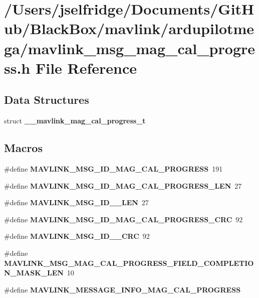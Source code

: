 \section{/\+Users/jselfridge/\+Documents/\+Git\+Hub/\+Black\+Box/mavlink/ardupilotmega/mavlink\+\_\+msg\+\_\+mag\+\_\+cal\+\_\+progress.h File Reference}
\label{mavlink__msg__mag__cal__progress_8h}
\subsection*{Data Structures}
\begin{DoxyCompactItemize}
\item 
struct \textbf{ \+\_\+\+\_\+mavlink\+\_\+mag\+\_\+cal\+\_\+progress\+\_\+t}
\end{DoxyCompactItemize}
\subsection*{Macros}
\begin{DoxyCompactItemize}
\item 
\#define \textbf{ M\+A\+V\+L\+I\+N\+K\+\_\+\+M\+S\+G\+\_\+\+I\+D\+\_\+\+M\+A\+G\+\_\+\+C\+A\+L\+\_\+\+P\+R\+O\+G\+R\+E\+SS}~191
\item 
\#define \textbf{ M\+A\+V\+L\+I\+N\+K\+\_\+\+M\+S\+G\+\_\+\+I\+D\+\_\+\+M\+A\+G\+\_\+\+C\+A\+L\+\_\+\+P\+R\+O\+G\+R\+E\+S\+S\+\_\+\+L\+EN}~27
\item 
\#define \textbf{ M\+A\+V\+L\+I\+N\+K\+\_\+\+M\+S\+G\+\_\+\+I\+D\+\_\+\_\+\+L\+EN}~27
\item 
\#define \textbf{ M\+A\+V\+L\+I\+N\+K\+\_\+\+M\+S\+G\+\_\+\+I\+D\+\_\+\+M\+A\+G\+\_\+\+C\+A\+L\+\_\+\+P\+R\+O\+G\+R\+E\+S\+S\+\_\+\+C\+RC}~92
\item 
\#define \textbf{ M\+A\+V\+L\+I\+N\+K\+\_\+\+M\+S\+G\+\_\+\+I\+D\+\_\+\_\+\+C\+RC}~92
\item 
\#define \textbf{ M\+A\+V\+L\+I\+N\+K\+\_\+\+M\+S\+G\+\_\+\+M\+A\+G\+\_\+\+C\+A\+L\+\_\+\+P\+R\+O\+G\+R\+E\+S\+S\+\_\+\+F\+I\+E\+L\+D\+\_\+\+C\+O\+M\+P\+L\+E\+T\+I\+O\+N\+\_\+\+M\+A\+S\+K\+\_\+\+L\+EN}~10
\item 
\#define \textbf{ M\+A\+V\+L\+I\+N\+K\+\_\+\+M\+E\+S\+S\+A\+G\+E\+\_\+\+I\+N\+F\+O\+\_\+\+M\+A\+G\+\_\+\+C\+A\+L\+\_\+\+P\+R\+O\+G\+R\+E\+SS}
\end{DoxyCompactItemize}
